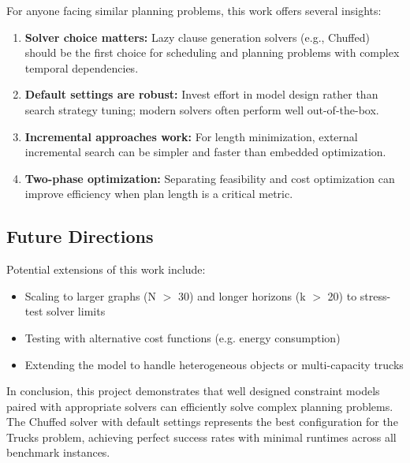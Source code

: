 \documentclass[a4paper,12pt]{article}
\begin{document}
For anyone facing similar planning problems, this work offers several insights:
\begin{enumerate}
    \item \textbf{Solver choice matters:} Lazy clause generation solvers (e.g., Chuffed) should be the first choice for scheduling and planning problems with complex temporal dependencies.
    \item \textbf{Default settings are robust:} Invest effort in model design rather than search strategy tuning; modern solvers often perform well out-of-the-box.
    \item \textbf{Incremental approaches work:} For length minimization, external incremental search can be simpler and faster than embedded optimization.
    \item \textbf{Two-phase optimization:} Separating feasibility and cost optimization can improve efficiency when plan length is a critical metric.
\end{enumerate}

\subsection{Future Directions}

Potential extensions of this work include:
\begin{itemize}
    \item Scaling to larger graphs (N $>$ 30) and longer horizons (k $>$ 20) to stress-test solver limits
    \item Testing with alternative cost functions (e.g. energy consumption)
    \item Extending the model to handle heterogeneous objects or multi-capacity trucks
\end{itemize}

In conclusion, this project demonstrates that well designed constraint models paired with appropriate solvers can efficiently solve complex planning problems. The Chuffed solver with default settings represents the best configuration for the Trucks problem, achieving perfect success rates with minimal runtimes across all benchmark instances.
\end{document}
